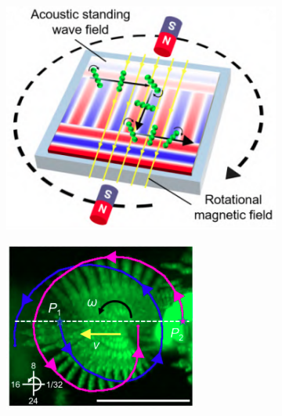 \begin{figure}[b]
    \begin{subfigure}{.38\columnwidth}
    \centering
    \includegraphics[width=\textwidth]{images/intro/microswimmers_generalScheme.png}
    \caption{}
    \label{fig:ms_gen}
    \end{subfigure}
    \begin{subfigure}{.38\columnwidth}
    \centering
    \includegraphics[width=\textwidth]{images/intro/microswimmers_rotation.png}

\end{subfigure}
\end{figure}
